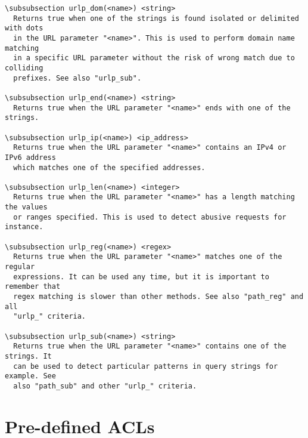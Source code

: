 \begin{verbatim}
\subsubsection urlp_dom(<name>) <string>
  Returns true when one of the strings is found isolated or delimited with dots
  in the URL parameter "<name>". This is used to perform domain name matching
  in a specific URL parameter without the risk of wrong match due to colliding
  prefixes. See also "urlp_sub".

\subsubsection urlp_end(<name>) <string>
  Returns true when the URL parameter "<name>" ends with one of the strings.

\subsubsection urlp_ip(<name>) <ip_address>
  Returns true when the URL parameter "<name>" contains an IPv4 or IPv6 address
  which matches one of the specified addresses.

\subsubsection urlp_len(<name>) <integer>
  Returns true when the URL parameter "<name>" has a length matching the values
  or ranges specified. This is used to detect abusive requests for instance.

\subsubsection urlp_reg(<name>) <regex>
  Returns true when the URL parameter "<name>" matches one of the regular
  expressions. It can be used any time, but it is important to remember that
  regex matching is slower than other methods. See also "path_reg" and all
  "urlp_" criteria.

\subsubsection urlp_sub(<name>) <string>
  Returns true when the URL parameter "<name>" contains one of the strings. It
  can be used to detect particular patterns in query strings for example. See
  also "path_sub" and other "urlp_" criteria.
\end{verbatim}

\section{Pre-defined ACLs}

